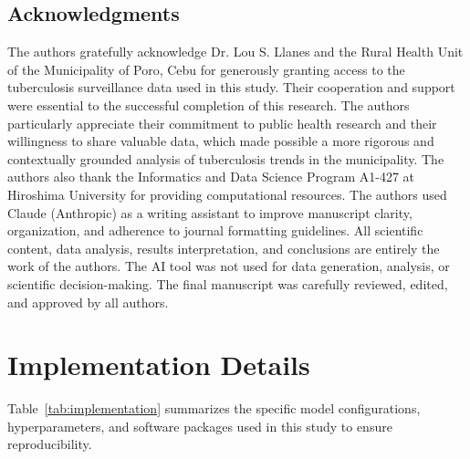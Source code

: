 \documentclass[final,3p,times,twocolumn,authoryear]{elsarticle}
\begin{document}
\subsection*{Acknowledgments}
The authors gratefully acknowledge Dr. Lou S. Llanes and the Rural Health Unit of the Municipality of Poro, Cebu for generously granting access to the tuberculosis surveillance data used in this study. Their cooperation and support were essential to the successful completion of this research. The authors particularly appreciate their commitment to public health research and their willingness to share valuable data, which made possible a more rigorous and contextually grounded analysis of tuberculosis trends in the municipality. The authors also thank the Informatics and Data Science Program A1-427 at Hiroshima University for providing computational resources. The authors used Claude (Anthropic) as a writing assistant to improve manuscript clarity, organization, and adherence to journal formatting guidelines. All scientific content, data analysis, results interpretation, and conclusions are entirely the work of the authors. The AI tool was not used for data generation, analysis, or scientific decision-making. The final manuscript was carefully reviewed, edited, and approved by all authors.

\clearpage
\onecolumn
\appendix
\section{Implementation Details}
\label{app:details}
Table~\ref{tab:implementation} summarizes the specific model configurations, hyperparameters, and software packages used in this study to ensure reproducibility.
\end{document}
